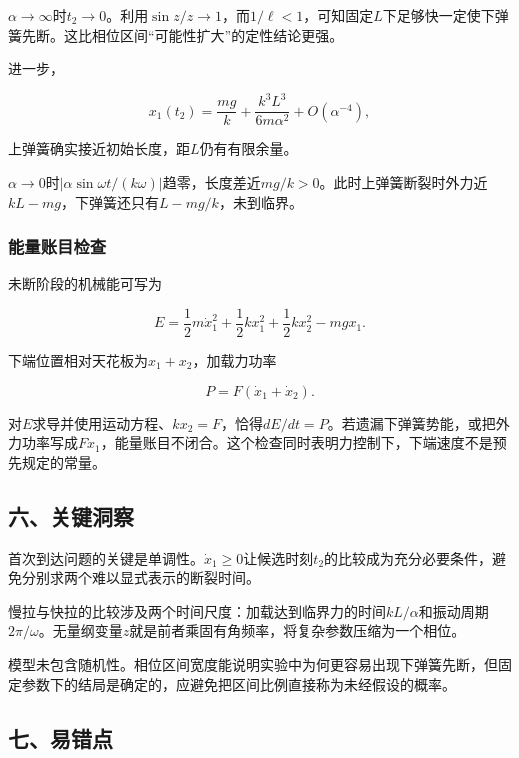 \documentclass[12pt,a4paper,fontset=fandol]{ctexart}
\begin{document}
\(\alpha\to\infty\)时\(t_2\to0\)。利用\(\sin z/z\to1\)，而\(1/\ell<1\)，可知固定\(L\)下足够快一定使下弹簧先断。这比相位区间``可能性扩大''的定性结论更强。

进一步，

\[
x_1(t_2)=\frac{mg}k+\frac{k^3L^3}{6m\alpha^2}
+O(\alpha^{-4}),
\]

上弹簧确实接近初始长度，距\(L\)仍有有限余量。

\(\alpha\to0\)时\(|\alpha\sin\omega t/(k\omega)|\)趋零，长度差近\(mg/k>0\)。此时上弹簧断裂时外力近\(kL-mg\)，下弹簧还只有\(L-mg/k\)，未到临界。

\par\noindent\begin{minipage}{\linewidth}
\subsubsection{能量账目检查}\label{ux80fdux91cfux8d26ux76eeux68c0ux67e5}

未断阶段的机械能可写为

\[
E=\frac12m\dot x_1^2
+\frac12kx_1^2+\frac12kx_2^2-mgx_1.
\]

下端位置相对天花板为\(x_1+x_2\)，加载力功率

\[
P=F(\dot x_1+\dot x_2).
\]

对\(E\)求导并使用运动方程、\(kx_2=F\)，恰得\(dE/dt=P\)。若遗漏下弹簧势能，或把外力功率写成\(F\dot x_1\)，能量账目不闭合。这个检查同时表明力控制下，下端速度不是预先规定的常量。

\end{minipage}\par
\subsection{六、关键洞察}\label{ux516dux5173ux952eux6d1eux5bdf-4}

首次到达问题的关键是单调性。\(\dot x_1\geq0\)让候选时刻\(t_2\)的比较成为充分必要条件，避免分别求两个难以显式表示的断裂时间。

慢拉与快拉的比较涉及两个时间尺度：加载达到临界力的时间\(kL/\alpha\)和振动周期\(2\pi/\omega\)。无量纲变量\(z\)就是前者乘固有角频率，将复杂参数压缩为一个相位。

模型未包含随机性。相位区间宽度能说明实验中为何更容易出现下弹簧先断，但固定参数下的结局是确定的，应避免把区间比例直接称为未经假设的概率。

\subsection{七、易错点}\label{ux4e03ux6613ux9519ux70b9-4}
\end{document}
